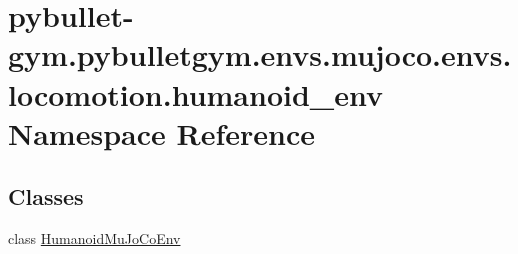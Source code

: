 \hypertarget{namespacepybullet-gym_1_1pybulletgym_1_1envs_1_1mujoco_1_1envs_1_1locomotion_1_1humanoid__env}{}\section{pybullet-\/gym.pybulletgym.\+envs.\+mujoco.\+envs.\+locomotion.\+humanoid\+\_\+env Namespace Reference}
\label{namespacepybullet-gym_1_1pybulletgym_1_1envs_1_1mujoco_1_1envs_1_1locomotion_1_1humanoid__env}
\subsection*{Classes}
\begin{DoxyCompactItemize}
\item 
class \hyperlink{classpybullet-gym_1_1pybulletgym_1_1envs_1_1mujoco_1_1envs_1_1locomotion_1_1humanoid__env_1_1_humanoid_mu_jo_co_env}{Humanoid\+Mu\+Jo\+Co\+Env}
\end{DoxyCompactItemize}
